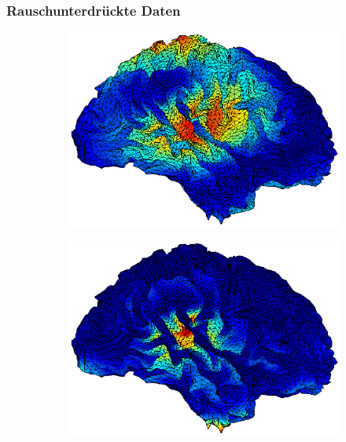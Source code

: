 \documentclass[doc,a4paper,12pt]{apa6}
\begin{document}
\subsubsection{Rauschunterdrückte Daten}

\begin{figure}
  \captionsetup{justification=centering}
  \begin{subfigure}[c]{0.47\textwidth}
    \includegraphics[width=\textwidth]{ergebnisse/activity/pa07_eve2_raw_lcmv_activity_right.eps}
    \label{img:pa07:aktiv:raw-lcmv}
  \end{subfigure}\hspace*{0.04\textwidth}
  \begin{subfigure}[c]{0.47\textwidth}
    \includegraphics[width=\textwidth]{ergebnisse/activity/pa07_eve2_raw_mne_activity_right.eps}

\end{subfigure}
\end{figure}
\end{document}
